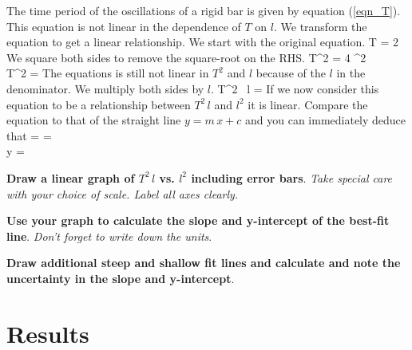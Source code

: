    The time period of the oscillations of a rigid bar is given by equation (\ref{eqn_T}). This equation is not linear in the dependence of $T$ on $l$. We transform the equation to get a linear relationship. We start with the original equation.
%
   \beqn
      T = 2 \pi {}
   \eeqn
   We square both sides to remove the square-root on the RHS.
   \beqsn
      T^2 = 4 \pi^2  \\[0.25\baselineskip]
      \imply T^2 =  
   \eeqsn
   The equations is still not linear in $T^2$ and $l$ because of the $l$ in the denominator. We multiply both sides by $l$.
   \beq
      T^2 \, l =  
   \eeq
   If we now consider this equation to be a relationship between $T^2 \, l$ and $l^2$ it is linear. Compare the equation to that of the straight line $y = m \, x + c$ and you can immediately deduce that
   \beqc \label{graph}
       =  = \\[0.5\baselineskip]
      y = 
   \eeqc

   \textbf{Draw a linear graph of $T^2 \, l$ vs. $l^2$ including error bars}. \textit{Take special care with your choice of scale. Label all axes clearly.}

   \textbf{Use your graph to calculate the slope and y-intercept of the best-fit line}. \textit{Don't forget to write down the units}.

   \textbf{Draw additional steep and shallow fit lines and calculate and note the uncertainty in the slope and y-intercept}.


\section*{Results}

